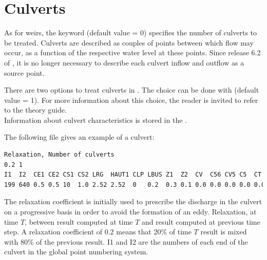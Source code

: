 \section{Culverts}
\label{sec:culverts}
As for weirs, the keyword  (default value = 0)
specifies the number of culverts to be treated.
Culverts are described as couples of points between which flow may occur,
as a function of the respective water level at these points.
Since release 6.2 of , it is no longer necessary to describe
each culvert inflow and outflow as a source point.

There are two options to treat culverts in .
The choice can be done with 
(default value = 1).
For more information about this choice, the reader is invited to refer to the
 theory guide.\\

Information about culvert characteristics is stored in the
.

The following file gives an example of a culvert:
\begin{lstlisting}[language=bash]
Relaxation, Number of culverts
0.2 1
I1  I2  CE1 CE2 CS1 CS2 LRG  HAUT1 CLP LBUS Z1  Z2  CV  C56 CV5 C5  CT  HAUT2 FRIC LENGTH CIRC D1  D2 A1 A2  AA
199 640 0.5 0.5 10  1.0 2.52 2.52  0   0.2  0.3 0.1 0.0 0.0 0.0 0.0 0.0 2.52  0.0  0.0    1    90. 0. 0. 90. 0

\end{lstlisting}

The relaxation coefficient is initially used to prescribe the discharge
in the culvert on a progressive basis in order to avoid the formation of an eddy.
Relaxation, at time $T$, between result computed at time $T$ and result
computed at previous time step.
A relaxation coefficient of 0.2 means that 20\% of time $T$ result is mixed
with 80\% of the previous result.
I1 and I2 are the numbers of each end of the culvert in the global point
numbering system.

